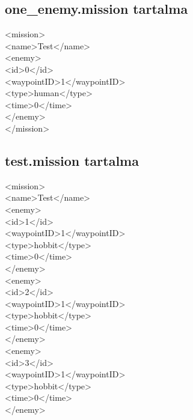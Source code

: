 \subsection{one\_enemy.mission tartalma}
<mission>\\
\phantom{pina}<name>Test</name>\\
\phantom{pina}<enemy>\\
\phantom{pina}\phantom{pina}<id>0</id>\\
\phantom{pina}\phantom{pina}<waypointID>1</waypointID>\\
\phantom{pina}\phantom{pina}<type>human</type>\\
\phantom{pina}\phantom{pina}<time>0</time>\\
\phantom{pina}</enemy>\\
</mission>\\
\subsection{test.mission tartalma}
<mission>\\
\phantom{pina}<name>Test</name>\\
\phantom{pina}<enemy>\\
\phantom{pina}\phantom{pina}<id>1</id>\\
\phantom{pina}\phantom{pina}<waypointID>1</waypointID>\\
\phantom{pina}\phantom{pina}<type>hobbit</type>\\
\phantom{pina}\phantom{pina}<time>0</time>\\
\phantom{pina}</enemy>\\
\phantom{pina}<enemy>\\
\phantom{pina}\phantom{pina}<id>2</id>\\
\phantom{pina}\phantom{pina}<waypointID>1</waypointID>\\
\phantom{pina}\phantom{pina}<type>hobbit</type>\\
\phantom{pina}\phantom{pina}<time>0</time>\\
\phantom{pina}</enemy>\\
\phantom{pina}<enemy>\\
\phantom{pina}\phantom{pina}<id>3</id>\\
\phantom{pina}\phantom{pina}<waypointID>1</waypointID>\\
\phantom{pina}\phantom{pina}<type>hobbit</type>\\
\phantom{pina}\phantom{pina}<time>0</time>\\
\phantom{pina}</enemy>\\
